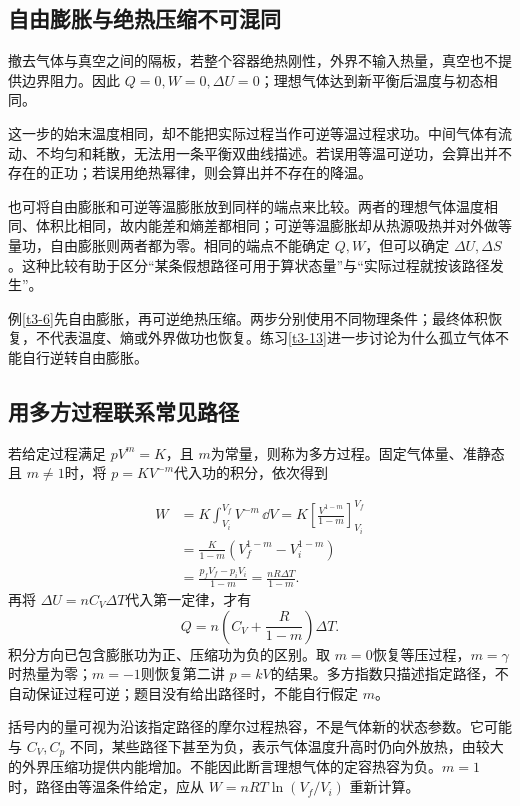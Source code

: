 \subsection{自由膨胀与绝热压缩不可混同}
撤去气体与真空之间的隔板，若整个容器绝热刚性，外界不输入热量，真空也不提供边界阻力。因此 $Q=0,W=0,\Delta U=0$；理想气体达到新平衡后温度与初态相同。

这一步的始末温度相同，却不能把实际过程当作可逆等温过程求功。中间气体有流动、不均匀和耗散，无法用一条平衡双曲线描述。若误用等温可逆功，会算出并不存在的正功；若误用绝热幂律，则会算出并不存在的降温。

也可将自由膨胀和可逆等温膨胀放到同样的端点来比较。两者的理想气体温度相同、体积比相同，故内能差和熵差都相同；可逆等温膨胀却从热源吸热并对外做等量功，自由膨胀则两者都为零。相同的端点不能确定 $Q,W$，但可以确定 $\Delta U,\Delta S$。这种比较有助于区分“某条假想路径可用于算状态量”与“实际过程就按该路径发生”。

例\ref{t3-6}先自由膨胀，再可逆绝热压缩。两步分别使用不同物理条件；最终体积恢复，不代表温度、熵或外界做功也恢复。练习\ref{t3-13}进一步讨论为什么孤立气体不能自行逆转自由膨胀。

\subsection{用多方过程联系常见路径}
若给定过程满足 $pV^m=K$，且 $m$为常量，则称为多方过程。固定气体量、准静态且 $m\ne1$时，将 $p=KV^{-m}$代入功的积分，依次得到

\[
\begin{aligned}
 W&=K\int_{V_i}^{V_f}V^{-m}\,\dd V
 =K\left[\frac{V^{1-m}}{1-m}\right]_{V_i}^{V_f}\\
 &=\frac{K}{1-m}(V_f^{1-m}-V_i^{1-m})\\
 &=\frac{p_fV_f-p_iV_i}{1-m}
 =\frac{nR\Delta T}{1-m}.
\end{aligned}
\]
再将 $\Delta U=nC_V\Delta T$代入第一定律，才有
\[
 Q=n\left(C_V+\frac R{1-m}\right)\Delta T.
\]
积分方向已包含膨胀功为正、压缩功为负的区别。取 $m=0$恢复等压过程，$m=\gamma$时热量为零；$m=-1$则恢复第二讲 $p=kV$的结果。多方指数只描述指定路径，不自动保证过程可逆；题目没有给出路径时，不能自行假定 $m$。


括号内的量可视为沿该指定路径的摩尔过程热容，不是气体新的状态参数。它可能与 $C_V,C_p$ 不同，某些路径下甚至为负，表示气体温度升高时仍向外放热，由较大的外界压缩功提供内能增加。不能因此断言理想气体的定容热容为负。$m=1$ 时，路径由等温条件给定，应从 $W=nRT\ln(V_f/V_i)$ 重新计算。





